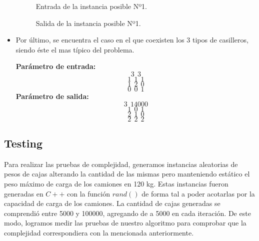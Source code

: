 \begin{itemize}
\begin{figure}[H] %
\hfill
\begin{minipage}[t]{.45\textwidth}
\begin{center}
\caption{Entrada de la instancia posible Nº1.}
\label{fig-tc1}
\end{center}
\end{minipage}
\hfill
\begin{minipage}[t]{.45\textwidth}
\begin{center}
\caption{Salida de la instancia posible Nº1.}
\label{fig-tc2}
\end{center}
\end{minipage}
\hfill
\end{figure}

\item Por último, se encuentra el caso en el que coexisten los 3 tipos de casilleros, siendo éste el mas típico del problema. \newline

\textbf{Parámetro de entrada:} 
$$3\ \ 3$$
$$1\ \ 1\ \ 1$$
$$1\ \ 2\ \ 0$$
$$0\ \ 0\ \ 1$$
\textbf{Parámetro de salida:} 
$$3\ \ 14000$$
$$1\ \ 0\ \ 1$$
$$2\ \ 1\ \ 0$$
$$2\ \ 2\ \ 2$$
\newline
\end{itemize}

\subsection{Testing}
Para realizar las pruebas de complejidad, generamos instancias aleatorias de pesos de cajas alterando la cantidad de las mismas pero manteniendo estático el peso máximo de carga de los camiones en 120 \unit{kg}. Estas instancias fueron generadas en $C++$ con la función $rand()$ de forma tal a poder acotarlas por la capacidad de carga de los camiones. La cantidad de cajas generadas se comprendió entre 5000 y 100000, agregando de a 5000 en cada iteración. De este modo, logramos medir las pruebas de nuestro algoritmo para comprobar que la complejidad correspondiera con la mencionada anteriormente.

